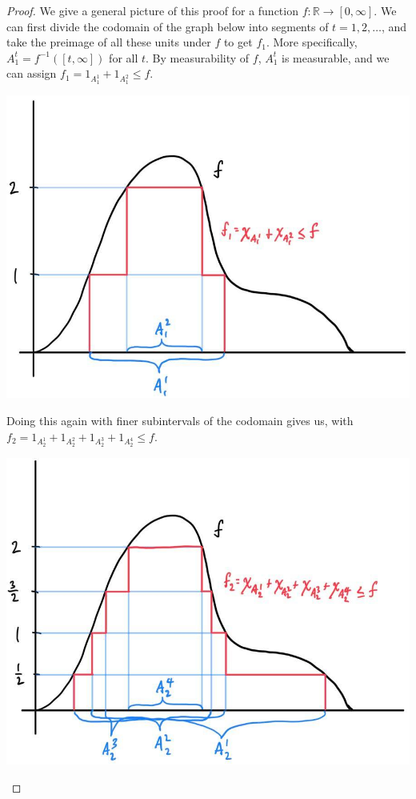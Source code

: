     \begin{proof}
      We give a general picture of this proof for a function $f: \mathbb{R} \longrightarrow [0, \infty]$. We can first divide the codomain of the graph below into segments of $t = 1, 2, \ldots$, and take the preimage of all these units under $f$ to get $f_1$. More specifically, $A_1^t = f^{-1} ([t, \infty])$ for all $t$. By measurability of $f$, $A_1^t$ is measurable, and we can assign $f_1 = 1_{A^1_1} + 1_{A_1^2} \leq f$. 
      \begin{center}
        \includegraphics[scale=0.23]{img/Lebesgue_1.jpg}
      \end{center}
      Doing this again with finer subintervals of the codomain gives us, with $f_2 = 1_{A_2^1} + 1_{A_2^2} + 1_{A_2^3} + 1_{A_2^4} \leq f$. 
      \begin{center}
        \includegraphics[scale=0.23]{img/Lebesgue_2.jpg}

\end{center}
\end{proof}
